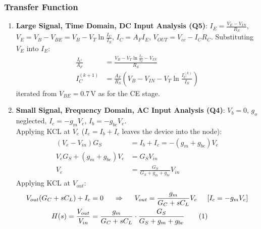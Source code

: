 \subsubsection{Transfer Function}
\begin{enumerate}
  \item \textbf{Large Signal, Time Domain, DC Input Analysis (Q5)}: \(I_E = \frac{V_E - V_{IN}}{R_S}\),
    \(V_E = V_B - V_{BE} = V_B - V_T \ln\frac{I_C}{I_S}\), \(I_C = A_F I_E\),
    \(V_{OUT} = V_{cc} - I_C R_C\). Substituting \(V_E\) into \(I_E\):
    \begin{align*}
      \frac{I_C}{A_F} &= \frac{V_B - V_T \ln\frac{I_C}{I_S} - V_{IN}}{R_S} \\
      I_C^{(k+1)} &= \frac{A_F}{R_S}\left(V_B - V_{IN} - V_T \ln\frac{I_C^{(k)}}{I_S}\right)
    \end{align*}
    iterated from \(V_{BE} = 0.7\,\)V as for the CE stage.
  \item \textbf{Small Signal, Frequency Domain, AC Input Analysis (Q4)}: \(V_b = 0\), \(g_o\) neglected,
    \(I_c = -g_m V_e\), \(I_b = -g_{be} V_e\).\\
    Applying KCL at \(V_e\) (\(I_e = I_b + I_c\) leaves the device into the node):
    \begin{align*}
      (V_e - V_{in}) G_S &= I_b + I_c = -(g_m + g_{be}) V_e \\
      V_e G_S + (g_m + g_{be}) V_e &= G_S V_{in} \\
      V_e &= \frac{G_S}{G_S + g_m + g_{be}} V_{in}
    \end{align*}
    Applying KCL at \(V_{out}\):
    \begin{align*}
      V_{out} (G_C + sC_L) + I_c &= 0 \hspace{0.5cm} \Rightarrow \hspace{0.5cm} V_{out} = \frac{g_m}{G_C + sC_L} V_e \hspace{0.5cm} [I_c = -g_m V_e] \\
      H(s) = \frac{V_{out}}{V_{in}} &= \frac{g_m}{G_C + sC_L}\cdot\frac{G_S}{G_S + g_m + g_{be}} \tag{1}
    \end{align*}
\end{enumerate}

